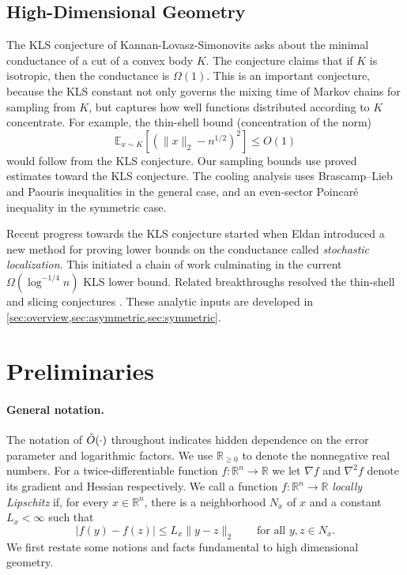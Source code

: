 \documentclass[11pt]{article}
\numberwithin{equation}{section}
\theoremstyle{definition}
\newcommand{\g}{\nabla}
\newcommand{\R}{\mathbb{R}}
\newcommand{\E}[2]{\mathbb{E}_{#1}\left[#2\right]}
\begin{document}
\subsection{High-Dimensional Geometry}
\label{subsec:highdim}

The KLS conjecture of Kannan-Lovasz-Simonovits \cite{KLS95:journal} asks about
the minimal conductance of a cut of a convex body $K$.
The conjecture claims that if $K$ is isotropic, then the conductance is
$\Omega(1)$.
This is an important conjecture, because the KLS constant not only governs the
mixing time of Markov chains for sampling from $K$, but captures how well
functions distributed according to
$K$ concentrate.
For example, the thin-shell bound (concentration of the norm)
\[
\E{x \sim K}{(\|x\|_2 - n^{1/2})^2} \le O(1)
\]
would follow from the KLS conjecture.
Our sampling bounds use proved estimates toward the KLS conjecture.
The cooling analysis uses Brascamp--Lieb and Paouris inequalities in the
general case, and an even-sector Poincar\'e inequality in the symmetric case.

Recent progress towards the KLS conjecture started when Eldan introduced a new
method for proving lower bounds on the conductance called \emph{stochastic
localization}.
This initiated a chain of work
\cite{E13:journal,LV24:journal,C21:journal,KL22:journal,JLV22:arxiv,K23:journal,KL25:arxiv,L26:arxiv}
culminating in the current $\Omega(\log^{-1/4} n)$ KLS lower bound.
Related breakthroughs resolved the thin-shell and slicing conjectures
\cite{K06:journal,G24:arxiv,KL25:journal,F10:journal,GM11:journal,EL14:book}.
These analytic inputs are developed in
\cref{sec:overview,sec:asymmetric,sec:symmetric}.

\section{Preliminaries}
\label{sec:prelim}
\label{sec:preliminaries}

\paragraph{General notation.} The notation of $\Tilde{O}(\cdot)$ throughout indicates hidden dependence on the error parameter and logarithmic factors. We use $\R_{\ge0}$ to denote the nonnegative real numbers. For a twice-differentiable function $f: \R^n \to \R$ we let $\g f$ and $\g^2 f$ denote its gradient and Hessian respectively. We call a function $f:\R^n\to\R$ \emph{locally Lipschitz} if, for every $x\in\R^n$, there is a neighborhood $N_x$ of $x$ and a constant $L_x<\infty$ such that
\[
 |f(y)-f(z)|\leq L_x\|y-z\|_2
 \qquad\text{for all }y,z\in N_x.
\]
We first restate some notions and facts fundamental to high dimensional
geometry.
\end{document}
